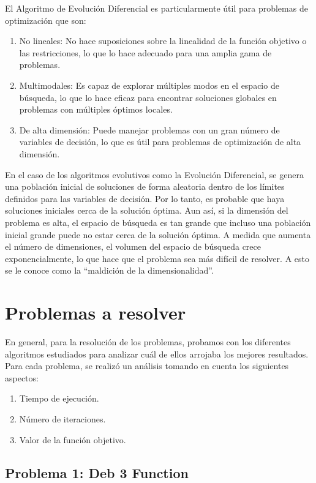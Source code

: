 \documentclass{article}
\begin{document}
El Algoritmo de Evolución Diferencial es particularmente útil para
problemas de optimización que son:

\begin{enumerate}
	\item No lineales: No hace suposiciones sobre la linealidad de
	      la función objetivo o las restricciones, lo que lo hace adecuado
	      para una amplia gama de problemas.
	\item Multimodales: Es capaz de explorar múltiples modos en el
	      espacio de búsqueda, lo que lo hace eficaz para encontrar
	      soluciones globales en problemas con múltiples óptimos locales.
	\item De alta dimensión: Puede manejar problemas con un gran
	      número de variables de decisión, lo que es útil para problemas
	      de optimización de alta dimensión.
\end{enumerate}

En el caso de los algoritmos evolutivos como la Evolución
Diferencial, se genera una población inicial de soluciones de forma
aleatoria dentro de los límites definidos para las variables de
decisión. Por lo tanto, es probable que haya soluciones iniciales
cerca de la solución óptima. Aun así, si la dimensión del problema
es alta, el espacio de búsqueda es tan grande que incluso una
población inicial grande puede no estar cerca de la solución óptima.
A medida que aumenta el número de dimensiones, el volumen del
espacio de búsqueda crece exponencialmente, lo que hace que el
problema sea más difícil de resolver. A esto se le conoce como la
“maldición de la dimensionalidad”.

\section{Problemas a resolver}

En general, para la resolución de los problemas, probamos con los
diferentes algoritmos estudiados para analizar cuál de ellos arrojaba
los mejores resultados. Para cada problema, se realizó un análisis
tomando en cuenta los siguientes aspectos:

\begin{enumerate}
	\item Tiempo de ejecución.
	\item Número de iteraciones.
	\item Valor de la función objetivo.
\end{enumerate}

\subsection{Problema 1: Deb 3 Function}
\end{document}
